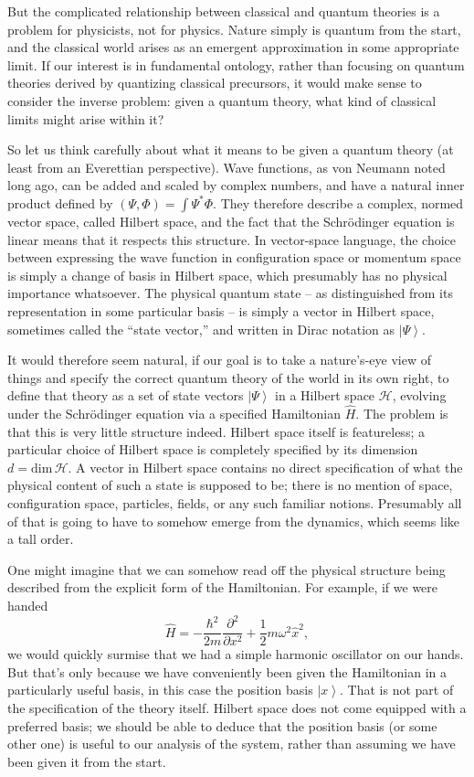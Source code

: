 \documentclass[12pt,english]{article}
\newcommand{\be}{\begin{equation}}
\newcommand{\ee}{\end{equation}}
\newcommand{\ham}{\hat{H}}
\newcommand{\HH}{\mathcal{H}}
\newcommand{\ket}[1]{\left| #1 \right\rangle}
\begin{document}
But the complicated relationship between classical and quantum theories is a problem for physicists, not for physics.
Nature simply is quantum from the start, and the classical world arises as an emergent approximation in some appropriate limit.
If our interest is in fundamental ontology, rather than focusing on quantum theories derived by quantizing classical precursors, it would make sense to consider the inverse problem: given a quantum theory, what kind of classical limits might arise within it?

So let us think carefully about what it means to be given a quantum theory (at least from an Everettian perspective).
Wave functions, as von Neumann noted long ago, can be added and scaled by complex numbers, and have a natural inner product defined by $(\Psi,\Phi) = \int \Psi^*\Phi$.
They therefore describe a complex, normed vector space, called Hilbert space, and the fact that the Schr\"odinger equation is linear means that it respects this structure.
In vector-space language, the choice between expressing the wave function in configuration space or momentum space is simply a change of basis in Hilbert space, which presumably has no physical importance whatsoever.
The physical quantum state -- as distinguished from its representation in some particular basis -- is simply a vector in Hilbert space, sometimes called the ``state vector,'' and written in Dirac notation as $\ket{\Psi}$.

It would therefore seem natural, if our goal is to take a nature's-eye view of things and specify the correct quantum theory of the world in its own right, to define that theory as a set of state vectors $\ket{\Psi}$ in a Hilbert space $\HH$, evolving under the Schr\"odinger equation via a specified Hamiltonian $\ham$.
The problem is that this is very little structure indeed.
Hilbert space itself is featureless; a particular choice of Hilbert space is completely specified by its dimension $d = \mathrm{dim}\,\HH$.
A vector in Hilbert space contains no direct specification of what the physical content of such a state is supposed to be; there is no mention of space, configuration space, particles, fields, or any such familiar notions.
Presumably all of that is going to have to somehow emerge from the dynamics, which seems like a tall order.

One might imagine that we can somehow read off the physical structure being described from the explicit form of the Hamiltonian.
For example, if we were handed
\be
  \ham = -\frac{\hbar^{2}}{2 m} \frac{\partial^{2}}{\partial x^{2}}+\frac{1}{2} m \omega^{2} \hat{x}^{2},
\ee
we would quickly surmise that we had a simple harmonic oscillator on our hands.
But that's only because we have conveniently been given the Hamiltonian in a particularly useful basis, in this case the position basis $\ket{x}$.
That is not part of the specification of the theory itself. 
Hilbert space does not come equipped with a preferred basis; we should be able to deduce that the position basis (or some other one) is useful to our analysis of the system, rather than assuming we have been given it from the start.
\end{document}
